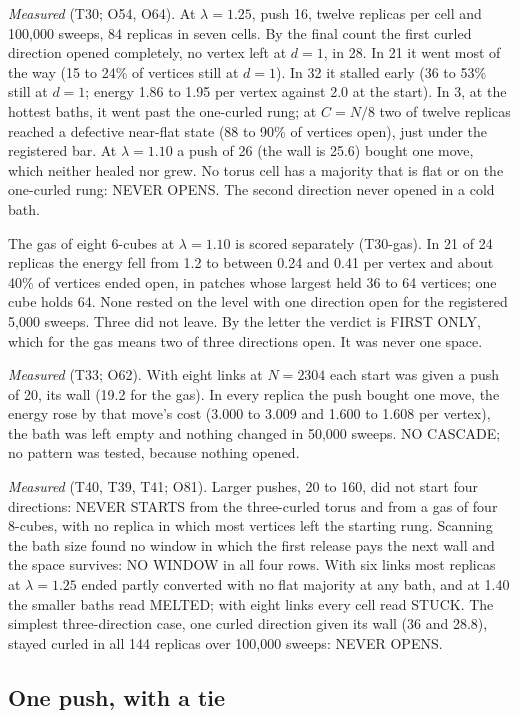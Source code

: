 \documentclass[aps,pre,10pt,twocolumn,superscriptaddress,nofootinbib]{revtex4-2}
\begin{document}
\emph{Measured} (T30; O54, O64). At $\lambda = 1.25$, push 16, twelve replicas per cell and 100,000 sweeps, 84
replicas in seven cells. By the final count the first curled direction opened completely, no vertex left at
$d = 1$, in 28. In 21 it went most of the way (15 to 24\% of vertices still at $d = 1$). In 32 it stalled early (36
to 53\% still at $d = 1$; energy 1.86 to 1.95 per vertex against 2.0 at the start). In 3, at the hottest baths, it
went past the one-curled rung; at $C = N/8$ two of twelve replicas reached a defective near-flat state (88 to 90\%
of vertices open), just under the registered bar. At $\lambda = 1.10$ a push of 26 (the wall is 25.6) bought one
move, which neither healed nor grew. No torus cell has a majority that is flat or on the one-curled rung: NEVER
OPENS. The second direction never opened in a cold bath.

The gas of eight 6-cubes at $\lambda = 1.10$ is scored separately (T30-gas). In 21 of 24 replicas the energy fell
from 1.2 to between 0.24 and 0.41 per vertex and about 40\% of vertices ended open, in patches whose largest held 36
to 64 vertices; one cube holds 64. None rested on the level with one direction open for the registered 5,000 sweeps.
Three did not leave. By the letter the verdict is FIRST ONLY, which for the gas means two of three directions open.
It was never one space.

\emph{Measured} (T33; O62). With eight links at $N = 2304$ each start was given a push of 20, its wall (19.2 for
the gas). In every replica the push bought one move, the energy rose by that move's cost (3.000 to 3.009 and 1.600
to 1.608 per vertex), the bath was left empty and nothing changed in 50,000 sweeps. NO CASCADE; no pattern was
tested, because nothing opened.

\emph{Measured} (T40, T39, T41; O81). Larger pushes, 20 to 160, did not start four directions: NEVER STARTS from the
three-curled torus and from a gas of four 8-cubes, with no replica in which most vertices left the starting rung.
Scanning the bath size found no window in which the first release pays the next wall and the space survives: NO
WINDOW in all four rows. With six links most replicas at $\lambda = 1.25$ ended partly converted with no flat
majority at any bath, and at 1.40 the smaller baths read MELTED; with eight links every cell read STUCK. The simplest
three-direction case, one curled direction given its wall (36 and 28.8), stayed curled in all 144 replicas over
100,000 sweeps: NEVER OPENS.

\subsection{One push, with a tie}
\end{document}
